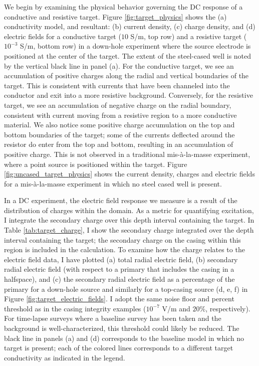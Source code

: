 We begin by examining the physical behavior governing the DC response of a conductive and resistive target. Figure \ref{fig:target_physics} shows the (a) conductivity model, and resultant: (b) current density, (c) charge density, and (d) electric fields for a conductive target ($10$ S/m, top row) and a resistive target ($10^{-3}$ S/m, bottom row) in a down-hole experiment where the source electrode is positioned at the center of the target. The extent of the steel-cased well is noted by the vertical black line in panel (a). For the conductive target, we see an accumulation of positive charges along the radial and vertical boundaries of the target. This is consistent with currents that have been channeled into the conductor and exit into a more resistive background. Conversely, for the resistive target, we see an accumulation of negative charge on the radial boundary, consistent with current moving from a resistive region to a more conductive material. We also notice some positive charge accumulation on the top and bottom boundaries of the target; some of the currents deflected around the resistor do enter from the top and bottom, resulting in an accumulation of positive charge. This is not observed in a traditional mis-\`a-la-masse experiment, where a point source is positioned within the target. Figure \ref{fig:uncased_target_physics} shows the current density, charges and electric fields for a mis-\`a-la-masse experiment in which no steel cased well is present.






In a DC experiment, the electric field response we measure is a result of the distribution of charges within the domain. As a metric for quantifying excitation, I integrate the secondary charge over this depth interval containing the target. In Table \ref{tab:target_charge}, I show the secondary charge integrated over the depth interval containing the target; the secondary charge on the casing within this region is included in the calculation. To examine how the charge relates to the electric field data, I have plotted (a) total radial electric field, (b) secondary radial electric field (with respect to a primary that includes the casing in a halfspace), and (c) the secondary radial electric field as a percentage of the primary for a down-hole source and similarly for a top-casing source (d, e, f) in Figure \ref{fig:target_electric_fields}. I adopt the same noise floor and percent threshold as in the casing integrity examples ($10^{-7}$ V/m and $20\%$, respectively). For time-lapse surveys where a baseline survey has been taken and the background is well-characterized, this threshold could likely be reduced. The black line in panels (a) and (d) corresponds to the baseline model in which no target is present; each of the colored lines corresponds to a different target conductivity as indicated in the legend.



